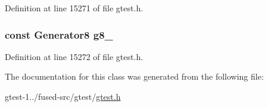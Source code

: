 \-Definition at line 15271 of file gtest.\-h.

\hypertarget{classtesting_1_1internal_1_1CartesianProductHolder8_a33efc612232313b29b814adcffee62e6}{
\subsubsection[{g8\-\_\-}]{\setlength{\rightskip}{0pt plus 5cm}const \-Generator8 {\bf g8\-\_\-}}}\label{d6/d77/classtesting_1_1internal_1_1CartesianProductHolder8_a33efc612232313b29b814adcffee62e6}


\-Definition at line 15272 of file gtest.\-h.



\-The documentation for this class was generated from the following file\-:\begin{DoxyCompactItemize}
\item 
gtest-\/1../fused-\/src/gtest/\hyperlink{fused-src_2gtest_2gtest_8h}{gtest.\-h}\end{DoxyCompactItemize}
